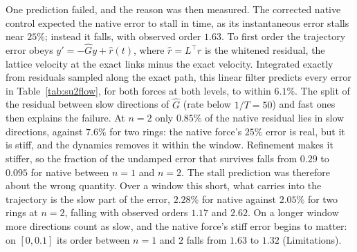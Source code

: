 \documentclass[11pt]{article}
\theoremstyle{definition}
\theoremstyle{remark}
\begin{document}
One prediction failed, and the reason was then measured. The corrected native control
expected the native error to stall in time, as its instantaneous error stalls near $25\%$;
instead it falls, with observed order $1.63$. To first order the trajectory error obeys
$y'=-\hat Gy+\hat r(t)$, where $\hat r=L^\top r$ is the whitened residual, the lattice
velocity at the exact links minus the exact velocity. Integrated exactly from residuals
sampled along the exact path, this linear filter predicts every error in
Table~\ref{tab:su2flow}, for both forces at both levels, to within $6.1\%$. The split of the
residual between slow directions of $\hat G$ (rate below $1/T=50$) and fast ones then
explains the failure. At $n=2$ only $0.85\%$ of the native residual lies in slow directions,
against $7.6\%$ for two rings: the native force's $25\%$ error is real, but it is stiff, and the
dynamics removes it within the window. Refinement makes it stiffer, so the fraction of the
undamped error that survives falls from $0.29$ to $0.095$ for native between $n=1$ and $n=2$.
The stall prediction was therefore about the wrong quantity. Over a window this short, what
carries into the trajectory is the slow part of the error, $2.28\%$ for native against $2.05\%$
for two rings at $n=2$, falling with observed orders $1.17$ and $2.62$. On a longer window
more directions count as slow, and the native force's stiff error begins to matter: on
$[0,0.1]$ its order between $n=1$ and $2$ falls from $1.63$ to $1.32$ (Limitations).
\end{document}
